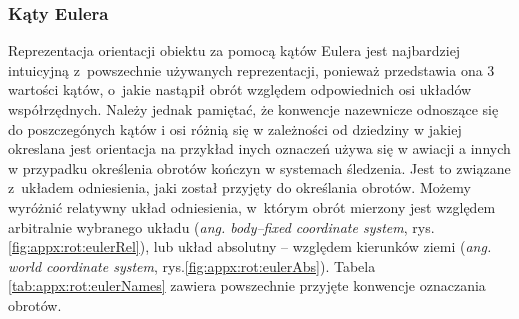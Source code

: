 \subsubsection*{Kąty Eulera} \label{sec:orientstionRep:euler}
Reprezentacja orientacji obiektu za pomocą kątów Eulera jest najbardziej intuicyjną z~powszechnie używanych reprezentacji, ponieważ przedstawia ona 3 wartości kątów, o~jakie nastąpił obrót względem odpowiednich osi układów współrzędnych. Należy jednak pamiętać, że konwencje nazewnicze odnoszące się do poszczegónych kątów i osi różnią się w zależności od dziedziny w jakiej okreslana jest orientacja na przykład inych oznaczeń używa się w awiacji a innych w przypadku określenia obrotów kończyn w systemach śledzenia. Jest to związane z~układem odniesienia, jaki został przyjęty do określania obrotów. Możemy wyróżnić relatywny układ odniesienia, w~którym obrót mierzony jest względem arbitralnie wybranego układu (\emph{ang. body--fixed coordinate system}, rys.\ref{fig:appx:rot:eulerRel}), lub układ absolutny -- względem kierunków ziemi (\emph{ang. world coordinate system}, rys.\ref{fig:appx:rot:eulerAbs}). Tabela \ref{tab:appx:rot:eulerNames} zawiera powszechnie przyjęte konwencje oznaczania obrotów.
																													
